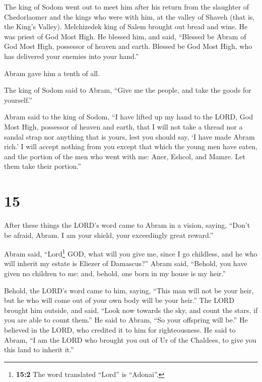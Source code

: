  The king of Sodom went out to meet him after his return
from the slaughter of Chedorlaomer and the kings who were with him, at
the valley of Shaveh (that is, the King's Valley). 
Melchizedek king of Salem brought out bread and wine. He was priest of
God Most High.  He blessed him, and said, ``Blessed be
Abram of God Most High, possessor of heaven and earth. 
Blessed be God Most High, who has delivered your enemies into your
hand.''

Abram gave him a tenth of all.

 The king of Sodom said to Abram, ``Give me the people,
and take the goods for yourself.''

 Abram said to the king of Sodom, ``I have lifted up my
hand to the LORD, God Most High, possessor of heaven and earth,
 that I will not take a thread nor a sandal strap nor
anything that is yours, lest you should say, `I have made Abram rich.'
 I will accept nothing from you except that which the
young men have eaten, and the portion of the men who went with me: Aner,
Eshcol, and Mamre. Let them take their portion.''

\hypertarget{section-14}{%
\section{15}\label{section-14}}

 After these things the LORD's word came to Abram in a
vision, saying, ``Don't be afraid, Abram. I am your shield, your
exceedingly great reward.''

 Abram said, ``Lord\footnote{\textbf{15:2} The word
  translated ``Lord'' is ``Adonai''.} GOD, what will you give me, since
I go childless, and he who will inherit my estate is Eliezer of
Damascus?''  Abram said, ``Behold, you have given no
children to me: and, behold, one born in my house is my heir.''

 Behold, the LORD's word came to him, saying, ``This man
will not be your heir, but he who will come out of your own body will be
your heir.''  The LORD brought him outside, and said,
``Look now towards the sky, and count the stars, if you are able to
count them.'' He said to Abram, ``So your offspring will be.''
 He believed in the LORD, who credited it to him for
righteousness.  He said to Abram, ``I am the LORD who
brought you out of Ur of the Chaldees, to give you this land to inherit
it.''

